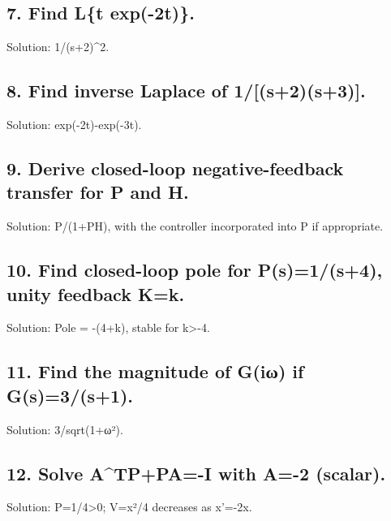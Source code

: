 \documentclass[11pt,a4paper]{article}
\begin{document}
\subsection{7. Find L\{t exp(-2t)\}.}
\begin{exambox}Solution: 1/(s+2)\textasciicircum{}2.\end{exambox}

\subsection{8. Find inverse Laplace of 1/[(s+2)(s+3)].}
\begin{exambox}Solution: exp(-2t)-exp(-3t).\end{exambox}

\subsection{9. Derive closed-loop negative-feedback transfer for P and H.}
\begin{exambox}Solution: P/(1+PH), with the controller incorporated into P if appropriate.\end{exambox}

\subsection{10. Find closed-loop pole for P(s)=1/(s+4), unity feedback K=k.}
\begin{exambox}Solution: Pole = -(4+k), stable for k>-4.\end{exambox}

\subsection{11. Find the magnitude of G(iω) if G(s)=3/(s+1).}
\begin{exambox}Solution: 3/sqrt(1+ω²).\end{exambox}

\subsection{12. Solve A\textasciicircum{}TP+PA=-I with A=-2 (scalar).}
\begin{exambox}Solution: P=1/4>0; V=x²/4 decreases as x'=-2x.\end{exambox}
\end{document}
